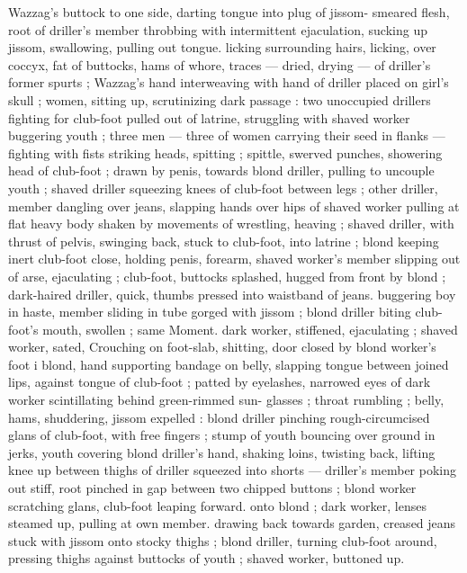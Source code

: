 {Wazzag's buttock to one side, darting tongue into plug of jissom- 
smeared flesh, root of driller's member throbbing with intermittent 
ejaculation, sucking up jissom, swallowing, pulling out tongue. licking 
surrounding hairs, licking, over coccyx, fat of buttocks, hams of 
whore, traces --- dried, drying --- of driller's former spurts ; 
Wazzag's hand interweaving with hand of driller placed on girl's skull 
; women, sitting up, scrutinizing dark passage : two unoccupied 
drillers fighting for club-foot pulled out of latrine, struggling with 
shaved worker buggering youth ; three men --- three of women 
carrying their seed in flanks --- fighting with fists striking heads, 
spitting ; spittle, swerved punches, showering head of club-foot ; 
drawn by penis, towards blond driller, pulling to uncouple youth ; 
shaved driller squeezing knees of club-foot between legs ; other 
driller, member dangling over jeans, slapping hands over hips of 
shaved worker pulling at flat heavy body shaken by movements of 
wrestling, heaving ; shaved driller, with thrust of pelvis, swinging 
back, stuck to club-foot, into latrine ; blond keeping inert club-foot 
close, holding penis, forearm, shaved worker's member slipping out 
of arse, ejaculating ; club-foot, buttocks splashed, hugged from front 
by blond ; dark-haired driller, quick, thumbs pressed into waistband 
of jeans. buggering boy in haste, member sliding in tube gorged with 
jissom ; blond driller biting club-foot's mouth, swollen ; same 
Moment. dark worker, stiffened, ejaculating ; shaved worker, sated, 
Crouching on foot-slab, shitting, door closed by blond worker's foot 
i blond, hand supporting bandage on belly, slapping tongue between 
joined lips, against tongue of club-foot ; patted by eyelashes, 
narrowed eyes of dark worker scintillating behind green-rimmed sun- 
glasses ; throat rumbling ; belly, hams, shuddering, jissom expelled : 
blond driller pinching rough-circumcised glans of club-foot, with free 
fingers ; stump of youth bouncing over ground in jerks, youth 
covering blond driller's hand, shaking loins, twisting back, lifting 
knee up between thighs of driller squeezed into shorts --- driller's 
member poking out stiff, root pinched in gap between two chipped 
buttons ; blond worker scratching glans, club-foot leaping forward. 
onto blond ; dark worker, lenses steamed up, pulling at own member. 
drawing back towards garden, creased jeans stuck with jissom onto 
stocky thighs ; blond driller, turning club-foot around, pressing 
thighs against buttocks of youth ; shaved worker, buttoned up. 
}
